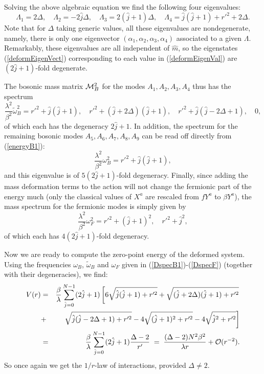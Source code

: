 \documentclass[a4paper,12pt]{article}
\begin{document}
{Solving the above algebraic equation we find the following four eigenvalues:
\begin{equation}
\Lambda_{1}=2\Delta,\quad \Lambda_{2}=-2\hat{j}\Delta,\quad\Lambda_{3}= 2(\hat{j}+1)\Delta ,\quad\Lambda_{4}= \hat{j}(\hat{j}+1)+r'^{2}+2\Delta.
\label{deformEigenVal}
\end{equation}
Note that for $\Delta$ taking generic values, all these eigenvalues are nondegenerate, namely, there is only one eigenvector $(\alpha_{1},\alpha_{2},\alpha_{3},\alpha_{4})$ associated to a given $\Lambda$. Remarkably, these eigenvalues are all independent of $\hat{m}$, so the eigenstates (\ref{deformEigenVect}) corresponding to each value in (\ref{deformEigenVal}) are $(2\hat{j}+1)$-fold degenerate.

The bosonic mass matrix ${\cal M}_{B}^{2}$ for the modes $A_{1},A_{2},A_{3},A_{4}$ thus has the spectrum
\begin{equation}
\frac{\lambda^{2}}{\beta^{2}}\tilde{\omega}_{B}^{2}=r'^{2}+\hat{j}(\hat{j}+1),\quad r'^{2}+(\hat{j}+2\Delta)(\hat{j}+1),\quad r'^{2}+\hat{j}(\hat{j}-2\Delta+1),\quad 0,
\label{DspecB1}
\end{equation}
of which each has the degeneracy $2\hat{j}+1$. In addition, the spectrum for the remaining bosonic modes $A_{5},A_{6},A_{7},A_{8},A_{9}$ can be read off directly from (\ref{energyB1}):
\begin{equation}
\frac{\lambda^{2}}{\beta^{2}}\omega_{B}^{2}=r'^{2}+\hat{j}(\hat{j}+1),
\label{DspecB2}
\end{equation}
and this eigenvalue is of $5(2\hat{j}+1)$-fold degeneracy. Finally, since adding the mass deformation terms to the action will not change the fermionic part of the energy much (only the classical values of $X^{a}$ are rescaled from $fY^{a}$ to $\beta Y^{a}$), the mass spectrum for the fermionic modes is simply given by
\begin{equation}
\frac{\lambda^{2}}{\beta^{2}}\omega_{F}^{2}=r'^{2}+(\hat{j}+1)^{2},\quad
r'^{2}+\hat{j}^{2},
\label{DspecF}
\end{equation}
of which each has $4(2\hat{j}+1)$-fold degeneracy.

Now we are ready to compute the zero-point energy of the deformed system. Using the frequencies $\omega_{B}$, $\tilde{\omega}_{B}$ and $\omega_{F}$ given in (\ref{DspecB1})-(\ref{DspecF}) (together with their degeneracies), we find:
\begin{eqnarray}
V(r)&=&\frac{\beta}{\lambda}\sum_{\hat{j}=0}^{N-1}(2\hat{j}+1)\left[6\sqrt{\hat{j}(\hat{j}+1)+r'^{2}}+\sqrt{(\hat{j}+2\Delta)(\hat{j}+1)+r'^{2}}\right.\nonumber\\
&+&\left.\sqrt{\hat{j}(\hat{j}-2\Delta+1)+r'^{2}}
-4\sqrt{(\hat{j}+1)^{2}+r'^{2}}-4\sqrt{\hat{j}^{2}+r'^{2}}\right]\nonumber\\
&=& \frac{\beta}{\lambda}\sum_{\hat{j}=0}^{N-1}(2\hat{j}+1)\frac{\Delta -2}{r'}\;=\;\frac{(\Delta-2)N^{2}\beta^{2}}{\lambda r}+{\cal O}(r^{-2}).
\label{ZeroEnergy2}
\end{eqnarray}
So once again we get the $1/r$-law of interactions, provided $\Delta\neq 2$.

}
\end{document}
